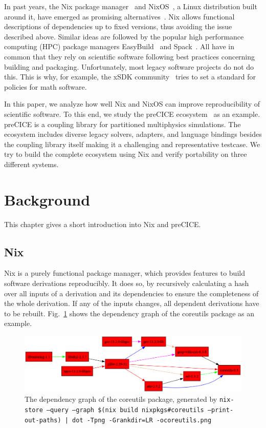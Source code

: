 \documentclass{eceasst}
\begin{document}
In past years, the Nix package manager~\cite{Dolstra_2004} and NixOS~\cite{Dolstra_2010}, a Linux distribution built around it, have emerged as promising alternatives~\cite{Devresse_2015}.
Nix allows functional descriptions of dependencies up to fixed versions, thus avoiding the issue described above.
Similar ideas are followed by the popular high performance computing (HPC) package managers EasyBuild~\cite{easybuil6495863} and Spack~\cite{spack7832814}.
All have in common that they rely on scientific software following best practices concerning building and packaging.
Unfortunately, most legacy software projects do not do this.
This is why, for example, the xSDK community~\cite{xSDK2023} tries to set a standard for policies for math software.

In this paper, we analyze how well Nix and NixOS can improve reproducibility of scientific software.
To this end, we study the preCICE ecosystem~\cite{preCICEv2} as an example.
preCICE is a coupling library for partitioned multiphysics simulations.
The ecosystem includes diverse legacy solvers, adapters, and language bindings besides the coupling library itself making it a challenging and representative testcase.
We try to build the complete ecosystem using Nix and verify portability on three different systems.

\section{Background}

This chapter gives a short introduction into Nix and preCICE.

\subsection{Nix}\label{sec:nix}

Nix is a purely functional package manager, which provides features to build software derivations reproducibly.
It does so, by recursively calculating a hash over all inputs of a derivation and its dependencies to ensure the completeness of the whole derivation.
If any of the inputs changes, all dependent derivations have to be rebuilt.
Fig.~\ref{fig:nix-graph} shows the dependency graph of the coreutils package as an example.

\begin{figure}
    \centering
    \includegraphics[width=1\textwidth]{figures/coreutils.png}
    \caption{The dependency graph of the coreutils package, generated by \texttt{nix-store --query --graph \$(nix build nixpkgs\#coreutils --print-out-paths) | dot -Tpng -Grankdir=LR -ocoreutils.png}}
    \label{fig:nix-graph}
\end{figure}
\end{document}
